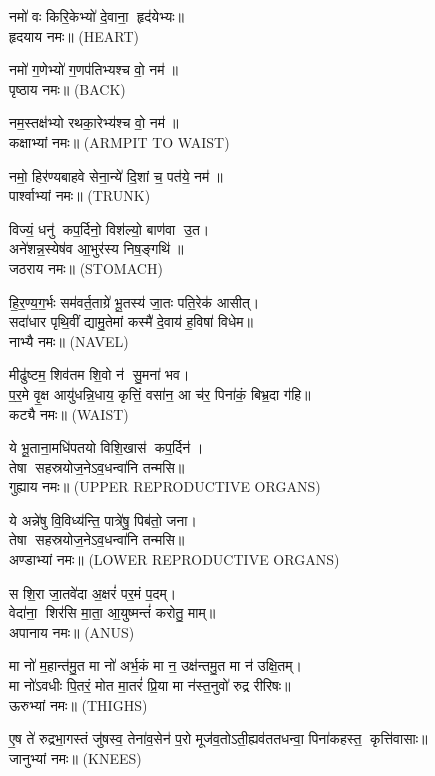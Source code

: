 नमो॑ वः किरि॒केभ्यो॑ दे॒वाना॒ हृद॑येभ्यः॥\\
हृदयाय नमः॥ {\scriptsize (HEART)}

नमो॑ ग॒णेभ्यो॑ ग॒णप॑तिभ्यश्च वो॒ नम॑॥\\
पृष्ठाय नमः॥ {\scriptsize (BACK)}

नम॒स्तक्ष॑भ्यो रथका॒रेभ्य॑श्च वो॒ नम॑॥\\
कक्षाभ्यां नमः॥ {\scriptsize (ARMPIT TO WAIST)}

नमो॒ हिर॑ण्यबाहवे सेना॒न्ये॑ दि॒शां च॒ पत॑ये॒ नम॑॥\\
पार्श्वाभ्यां नमः॥ {\scriptsize (TRUNK)}

 विज्यं॒ धनु॑ कप॒र्दिनो॒ विश॑ल्यो॒ बाण॑वा उ॒त।\\
 अने॑शन्न॒स्येष॑व आ॒भुर॑स्य निष॒ङ्गथि॑॥\\
जठराय नमः॥ {\scriptsize (STOMACH)}


हि॒र॒ण्य॒ग॒र्भः सम॑वर्त॒ताग्रे॑ भू॒तस्य॑ जा॒तः पति॒रेक॑ आसीत्।\\
सदा॑धार पृथि॒वीं द्यामु॒तेमां कस्मै॑ दे॒वाय॑ ह॒विषा॑ विधेम॥\\
नाभ्यै नमः॥ {\scriptsize (NAVEL)}

मीढु॑ष्टम॒ शिव॑तम शि॒वो न॑ सु॒मना॑ भव।\\
 प॒र॒मे वृ॒क्ष आयु॑धन्नि॒धाय॒ कृत्तिं॒ वसा॑न॒ आ च॑र॒ पिना॑कं॒ बिभ्र॒दा ग॑हि॥\\
कट्यै नमः॥ {\scriptsize (WAIST)}

 ये भू॒ताना॒मधि॑पतयो विशि॒खास॑ कप॒र्दिन॑। \\
तेषा सहस्रयोज॒नेऽव॒धन्वा॑नि तन्मसि॥ \\
गुह्याय नमः॥ {\scriptsize (UPPER REPRODUCTIVE ORGANS)}

ये अन्ने॑षु वि॒विध्य॑न्ति॒ पात्रे॑षु॒ पिब॑तो॒ जना\sn{}।\\
तेषा सहस्रयोज॒नेऽव॒धन्वा॑नि तन्मसि॥ \\
अण्डाभ्यां नमः॥ {\scriptsize (LOWER REPRODUCTIVE ORGANS)}

स शि॒रा जा॒तवे॑दा अ॒क्षरं॑ पर॒मं प॒दम्।\\
वेदा॑ना॒ शिर॑सि मा॒ता॒ आ॒युष्मन्तं॑ करोतु॒ माम्॥\\
अपानाय नमः॥ {\scriptsize (ANUS)}

मा नो॑ म॒हान्त॑मु॒त मा नो॑ अर्भ॒कं मा न॒ उक्ष॑न्तमु॒त मा न॑ उक्षि॒तम्।\\
 मा नो॑ऽवधीः पि॒तरं॒ मोत मा॒तरं॑ प्रि॒या मा न॑स्त॒नुवो॑ रुद्र रीरिषः॥\\
ऊरुभ्यां नमः॥ {\scriptsize (THIGHS)}

ए॒ष ते॑ रुद्रभा॒गस्तं जु॑षस्व॒ तेना॑व॒सेन॑ प॒रो मूज॑व॒तोऽती॒ह्यव॑ततधन्वा॒ पिना॑कहस्त॒ कृत्ति॑वासाः॥\\
जानुभ्यां नमः॥ {\scriptsize (KNEES)}

